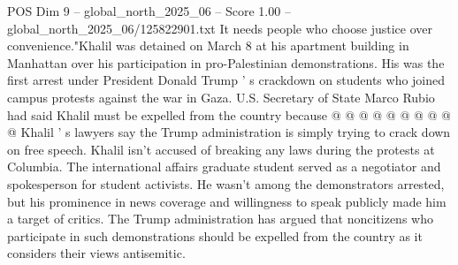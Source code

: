 \begin{textsample}{POS Dim 9 – global\_north\_2025\_06 – Score 1.00 – global\_north\_2025\_06/125822901.txt}
It needs people who choose justice over convenience."Khalil was detained on March 8 at his apartment building in Manhattan over his participation in pro-Palestinian demonstrations.
His was the first arrest under President Donald Trump ' s crackdown on students who joined campus protests against the war in Gaza.
U.S.
Secretary of State Marco Rubio had said Khalil must be expelled from the country because @ @ @ @ @ @ @ @ @ @ Khalil ' s lawyers say the Trump administration is simply trying to crack down on free speech.
Khalil isn't accused of breaking any laws during the protests at Columbia.
The international affairs graduate student served as a negotiator and spokesperson for student activists.
He wasn't among the demonstrators arrested, but his prominence in news coverage and willingness to speak publicly made him a target of critics.
The Trump administration has argued that noncitizens who participate in such demonstrations should be expelled from the country as it considers their views antisemitic.

\end{textsample}
